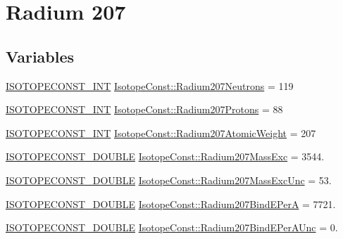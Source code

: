\hypertarget{group___isotope_const-_radium-_ra207}{}\section{Radium 207}
\label{group___isotope_const-_radium-_ra207}
\subsection*{Variables}
\begin{DoxyCompactItemize}
\item 
\mbox{\hyperlink{group___isotope_const-_macros_ga5f18360b3e99483a35c32d789e62621c}{I\+S\+O\+T\+O\+P\+E\+C\+O\+N\+S\+T\+\_\+\+I\+NT}} \mbox{\hyperlink{group___isotope_const-_radium-_ra207_ga5020636d6bceacd818600e096fb8bb4b}{Isotope\+Const\+::\+Radium207\+Neutrons}} = 119
\item 
\mbox{\hyperlink{group___isotope_const-_macros_ga5f18360b3e99483a35c32d789e62621c}{I\+S\+O\+T\+O\+P\+E\+C\+O\+N\+S\+T\+\_\+\+I\+NT}} \mbox{\hyperlink{group___isotope_const-_radium-_ra207_ga7548ad0ca877255a2e503cc8404404e8}{Isotope\+Const\+::\+Radium207\+Protons}} = 88
\item 
\mbox{\hyperlink{group___isotope_const-_macros_ga5f18360b3e99483a35c32d789e62621c}{I\+S\+O\+T\+O\+P\+E\+C\+O\+N\+S\+T\+\_\+\+I\+NT}} \mbox{\hyperlink{group___isotope_const-_radium-_ra207_ga0d1d30e7bfaa75e9e8e59b3a621b954a}{Isotope\+Const\+::\+Radium207\+Atomic\+Weight}} = 207
\item 
\mbox{\hyperlink{group___isotope_const-_macros_ga8f45a7272ce02c0b4c65c44636ed719a}{I\+S\+O\+T\+O\+P\+E\+C\+O\+N\+S\+T\+\_\+\+D\+O\+U\+B\+LE}} \mbox{\hyperlink{group___isotope_const-_radium-_ra207_ga715af263a871ca878bd813e747bb8aae}{Isotope\+Const\+::\+Radium207\+Mass\+Exc}} = 3544.
\item 
\mbox{\hyperlink{group___isotope_const-_macros_ga8f45a7272ce02c0b4c65c44636ed719a}{I\+S\+O\+T\+O\+P\+E\+C\+O\+N\+S\+T\+\_\+\+D\+O\+U\+B\+LE}} \mbox{\hyperlink{group___isotope_const-_radium-_ra207_ga42267c5f751524bcb2c1006f340b4160}{Isotope\+Const\+::\+Radium207\+Mass\+Exc\+Unc}} = 53.
\item 
\mbox{\hyperlink{group___isotope_const-_macros_ga8f45a7272ce02c0b4c65c44636ed719a}{I\+S\+O\+T\+O\+P\+E\+C\+O\+N\+S\+T\+\_\+\+D\+O\+U\+B\+LE}} \mbox{\hyperlink{group___isotope_const-_radium-_ra207_ga6436a5dcbee424a6fad756143f23d7a7}{Isotope\+Const\+::\+Radium207\+Bind\+E\+PerA}} = 7721.
\item 
\mbox{\hyperlink{group___isotope_const-_macros_ga8f45a7272ce02c0b4c65c44636ed719a}{I\+S\+O\+T\+O\+P\+E\+C\+O\+N\+S\+T\+\_\+\+D\+O\+U\+B\+LE}} \mbox{\hyperlink{group___isotope_const-_radium-_ra207_ga54743fcfeff5502cfa5bf3644ba10952}{Isotope\+Const\+::\+Radium207\+Bind\+E\+Per\+A\+Unc}} = 0.

\end{DoxyCompactItemize}
